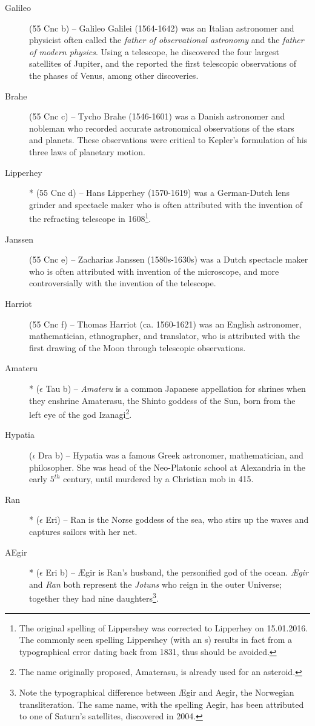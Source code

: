 \begin{description}
\item[Galileo] (55 Cnc b) -- Galileo Galilei (1564-1642) was an Italian astronomer and physicist often called the \textit{father of observational astronomy} and the \textit{father of modern physics}. Using a telescope, he discovered the four largest satellites of Jupiter, and the reported the first telescopic observations of the phases of Venus, among other discoveries.
\item[Brahe] (55 Cnc c) -- Tycho Brahe (1546-1601) was a Danish astronomer and nobleman who recorded accurate astronomical observations of the stars and planets. These observations were critical to Kepler's formulation of his three laws of planetary motion.
\item[Lipperhey]* (55 Cnc d) -- Hans Lipperhey (1570-1619) was a German-Dutch lens grinder and spectacle maker who is often attributed with the invention of the refracting telescope in 1608\footnote{The original spelling of Lippershey was corrected to Lipperhey on 15.01.2016. The commonly seen spelling Lippershey (with an s) results in fact from a typographical error dating back from 1831, thus should be avoided.}.
\item[Janssen] (55 Cnc e) -- Zacharias Janssen (1580s-1630s) was a Dutch spectacle maker who is often attributed with invention of the microscope, and more controversially with the invention of the telescope.
\item[Harriot] (55 Cnc f) -- Thomas Harriot (ca. 1560-1621) was an English astronomer, mathematician, ethnographer, and translator, who is attributed with the first drawing of the Moon through telescopic observations.
\item[Amateru]* ($\epsilon$ Tau b) -- \textit{Amateru} is a common Japanese appellation for shrines when they enshrine Amaterasu, the Shinto goddess of the Sun, born from the left eye of the god Izanagi\footnote{The name originally proposed, Amaterasu, is already used for an asteroid.}.
\item[Hypatia] ($\iota$ Dra b) -- Hypatia was a famous Greek astronomer, mathematician, and philosopher. She was head of the Neo-Platonic school at Alexandria in the early $5^{th}$ century, until murdered by a Christian mob in 415.
\item[Ran]* ($\epsilon$ Eri) -- Ran is the Norse goddess of the sea, who stirs up the waves and captures sailors with her net.
\item[AEgir]* ($\epsilon$ Eri b) -- {\AE}gir is Ran's husband, the personified god of the ocean. \textit{{\AE}gir} and \textit{Ran} both represent the \textit{Jotuns} who reign in the outer Universe; together they had nine daughters\footnote{Note the typographical difference between {\AE}gir and Aegir, the Norwegian transliteration. The same name, with the spelling Aegir, has been attributed to one of Saturn's satellites, discovered in 2004.}.

\end{description}
